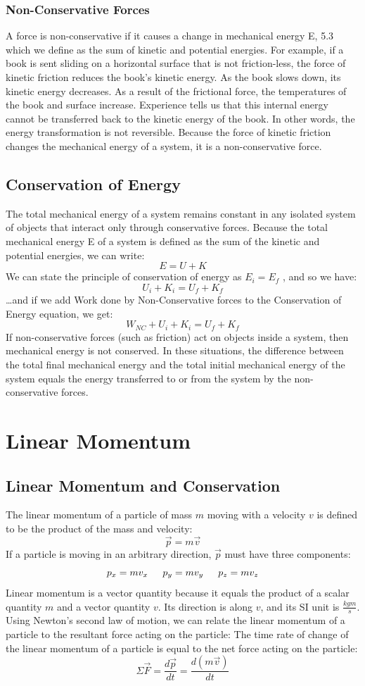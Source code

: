 \documentclass{article}
\begin{document}
\subsubsection{Non-Conservative Forces}
A force is non-conservative if it causes a change in mechanical energy E, 5.3 which we define as the sum of kinetic and potential energies. For example, if a book is sent sliding on a horizontal surface that is not friction-less, the force of kinetic friction reduces the book’s kinetic energy. As the book slows down, its kinetic energy decreases. As a result of the frictional force, the temperatures of the book and surface increase. Experience tells us that this internal energy cannot be transferred back to the kinetic energy of the book. In other words, the energy transformation is not reversible. Because the force of kinetic friction changes the mechanical energy of a system, it is a non-conservative force.
\subsection{Conservation of Energy}
The total mechanical energy of a system remains constant in any isolated system of objects that interact only through conservative forces. Because the total mechanical energy E of a system is defined as the sum of the kinetic and potential energies, we can write:
\[
E=U+K
\]
We can state the principle of conservation of energy as $E_i=E_f$ , and so we have:
\[
U_i+K_i=U_f+K_f
\]
\ldots and if we add Work done by Non-Conservative forces to the Conservation of Energy equation, we get:
\[
W_{NC}+U_i+K_i=U_f+K_f
\]
If non-conservative forces (such as friction) act on objects inside a system, then mechanical energy is not conserved. In these situations, the difference between the total final mechanical energy and the total initial mechanical energy of the system equals the energy transferred to or from the system by the non-conservative forces.

\section{Linear Momentum}
\subsection{Linear Momentum and Conservation}
The linear momentum of a particle of mass $m$ moving with a velocity $v$ is defined to be the product of the mass and velocity:
\[
\vec{p}=m\vec{v}
\]
If a particle is moving in an arbitrary direction, $\vec{p}$ must have three components:
\[
p_x=mv_x \indent
p_y=mv_y \indent
p_z=mv_z
\]
Linear momentum is a vector quantity because it equals the product of a scalar quantity $m$ and a vector quantity $v$. Its direction is along $v$, and its SI unit is $\frac{kgm}{s}$. Using Newton’s second law of motion, we can relate the linear momentum of a particle to the resultant force acting on the particle: The time rate of change of the linear momentum of a particle is equal to the net force acting on the particle:
\[
\Sigma\vec{F}=\frac{d\vec{p}}{dt}=\frac{d(m\vec{v})}{dt}
\]
\end{document}
